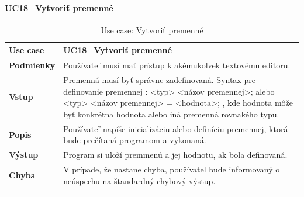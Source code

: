 \paragraph{UC18\_Vytvoriť premenné}
\begin{center}
	\begin{longtable}{|p{2.5cm}|p{12.2cm}|}
		
			\hline
			\textbf{Use case} & UC18\_Vytvoriť premenné \\ 
			\hline
			\textbf{Podmienky} & Používateľ musí mať prístup k akémukoľvek textovému editoru.  \\ 
			\hline
			\textbf{Vstup} & Premenná musí byť správne zadefinovaná. 
			\newline
			Syntax pre definovanie premennej : 
			\newline
			<typ> <názov premennej>; alebo 
			\newline
			 <typ> <názov premennej> = <hodnota>;
			 \newline
			 , kde hodnota môže byť konkrétna hodnota alebo iná premenná rovnakého typu.\\
			\hline
			\textbf{Popis} & Používateľ napíše inicializáciu alebo definíciu premennej, ktorá bude prečítaná programom a vykonaná.\\ 
			\hline
			\textbf{Výstup} & Program si uloží premmenú a jej hodnotu, ak bola definovaná.\\
			\hline
			\textbf{Chyba} & V prípade, že nastane chyba, používateľ bude informovaný o neúspechu na štandardný chybový výstup.\\
			\hline
			\caption{Use case: Vytvoriť premenné}
		\label{table:1}
	
	\end{longtable}
\end{center}
